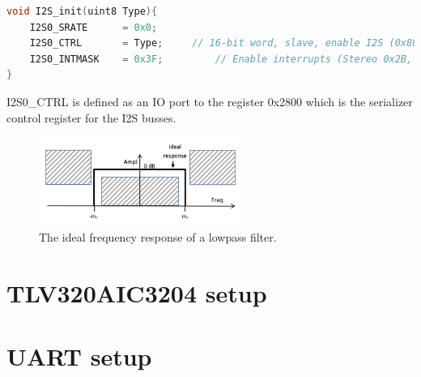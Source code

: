 \begin{lstlisting}[language=C, caption = {Setup of I2S port for the DSP},label={listingI2SDSP}]
void I2S_init(uint8 Type){
	I2S0_SRATE 		= 0x0;
    I2S0_CTRL 		= Type;    	// 16-bit word, slave, enable I2S (0x8010), stereo. 24-bit word, slave, enable I2S, mono (0x901C). 
    I2S0_INTMASK 	= 0x3F;    		// Enable interrupts (Stereo 0x2B, Mono 0x17)
}
\end{lstlisting}

I2S0\_CTRL is defined as an IO port to the register 0x2800 which is the serializer control register for the I2S busses.

\begin{figure}[H]
\centering
\includegraphics[width=0.6\textwidth]{figures/Ideal_filter.png}
\caption{The ideal frequency response of a lowpass filter.}
\label{fig:IdealFilterApp}
\end{figure}

\section{TLV320AIC3204 setup}


\section{UART setup} \label{UART_setup}

